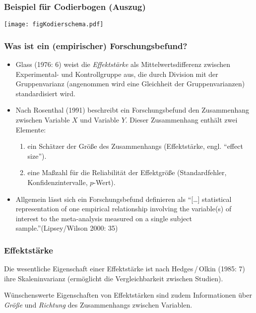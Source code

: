 \begin{frame}
  \frametitle{Beispiel für Codierbogen  (Auszug)}
  \texttt{[image: figKodierschema.pdf]}
\end{frame}


\begin{frame}
  \frametitle{Was ist ein (empirischer) Forschungsbefund?}
  \begin{small}
    \begin{itemize}[<+->]
    \item Glass (1976: 6) weist die \emph{Effektstärke} als Mittelwertsdifferenz zwischen Experimental- und
      Kontrollgruppe aus, die durch Division mit der Gruppenvarianz (angenommen wird eine Gleichheit der
      Gruppenvarianzen) standardisiert wird.
    \item Nach Rosenthal (1991) beschreibt ein Forschungsbefund den Zusammenhang zwischen Variable $X$ und Variable
      $Y$. Dieser Zusammenhang enthält zwei Elemente:
      \begin{enumerate}
      \item ein Schätzer der Größe des Zusammenhangs (Effektstärke, engl. "`effect size"').
      \item eine Maßzahl für die Reliabilität der Effektgröße (Standardfehler, Konfidenzintervalle, $p$-Wert).
      \end{enumerate}
    \item Allgemein lässt sich ein Forschungsbefund definieren als "`[\ldots] statistical representation of one
      empirical relationship involving the variable(s) of interest to the meta-analysis measured on a single subject
      sample."'(Lipsey/Wilson 2000: 35)
    \end{itemize}
  \end{small}
\end{frame}



\begin{frame}
  \frametitle{Effektstärke}
  \begin{itemize*}
  \item Die wesentliche Eigenschaft einer Effektstärke ist nach Hedges\,/\,Olkin (1985: 7) ihre Skaleninvarianz
    (ermöglicht die Vergleichbarkeit zwischen Studien).
  \item Wünschenswerte Eigenschaften von Effektstärken sind zudem Informationen über \emph{Größe} und \emph{Richtung}
    des Zusammenhangs zwischen Variablen.
  \end{itemize*}
\end{frame}

